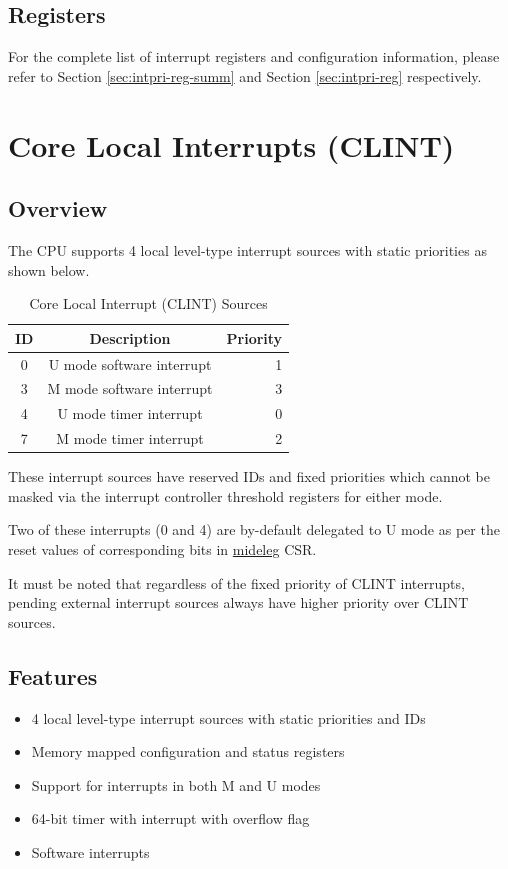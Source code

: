\documentclass[main\_\_EN.tex]{subfiles}
\begin{document}
\subsection{Registers}
\label{sec:riscvcpu-int-reg-summ}

For the complete list of interrupt registers and configuration information, please refer to Section \ref{sec:intpri-reg-summ} and Section \ref{sec:intpri-reg} respectively.



\clearpage
\section{Core Local Interrupts (CLINT)}
\label{sec:riscvcpu-clint}

\subsection{Overview}
\label{sec:riscvcpu-clint-overview}

The CPU supports 4 local level-type interrupt sources with static priorities as shown below.

\begin{longtable}{ | c | c | r | }
\caption{Core Local Interrupt (CLINT) Sources} \label{tab:riscvcpu-clint-table}
\\ \hline
\rowcolor{lightgray}
ID & Description & Priority \\ \hline
0 & U mode software interrupt & 1 \\ \hline
3 & M mode software interrupt & 3 \\ \hline
4 & U mode timer interrupt & 0 \\ \hline
7 & M mode timer interrupt & 2 \\ \hline
\end{longtable}

These interrupt sources have reserved IDs and fixed priorities which cannot be masked via the interrupt controller threshold registers for either mode.

Two of these interrupts (0 and 4) are by-default delegated to U mode as per the reset values of corresponding bits in \hyperref[regdesc:MIDELEG]{mideleg} CSR.

It must be noted that regardless of the fixed priority of CLINT interrupts, pending external interrupt sources always have higher priority over CLINT sources.

\subsection{Features}
\begin{itemize}
    \item 4 local level-type interrupt sources with static priorities and IDs
    \item Memory mapped configuration and status registers
    \item Support for interrupts in both M and U modes
    \item 64-bit timer with interrupt with overflow flag
    \item Software interrupts
\end{itemize}
\end{document}
